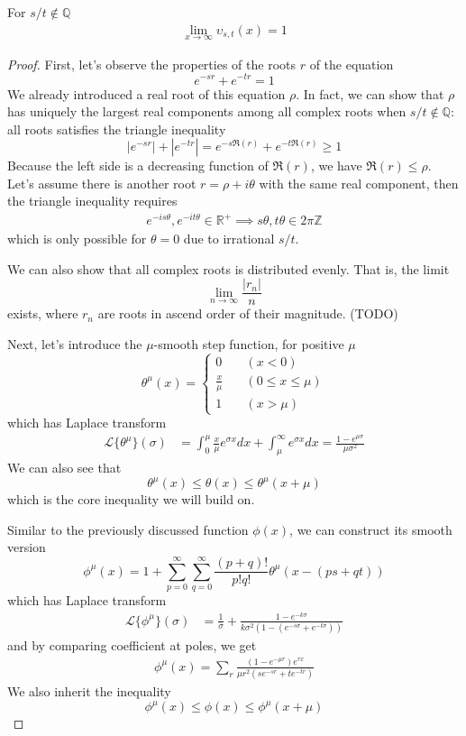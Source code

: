 \documentclass[]{article}
\begin{document}
\vspace{1cm}
\begin{lemma}
	For $s/t\notin\mathbb{Q}$
	\begin{align*}
	\lim_{x\to\infty} \upsilon_{s,t}(x) = 1 
	\end{align*}
\end{lemma}
\begin{proof}
First, let's observe the properties of the roots $r$ of the equation
\[
e^{-sr} + e^{-tr} = 1
\]
We already introduced a real root of this equation $\rho$. In fact, we can show that $\rho$ has uniquely the largest real components among all complex roots when $s/t\notin\mathbb{Q}$: all roots satisfies the triangle inequality
\[
|e^{-sr}| + |e^{-tr}| = e^{-s\Re(r)} + e^{-t\Re(r)} \ge 1
\]
Because the left side is a decreasing function of $\Re(r)$, we have $\Re(r) \le \rho$. Let's assume there is another root $r=\rho + i\theta$ with the same real component, then the triangle inequality requires
\begin{align*}
e^{-is\theta},e^{-it\theta}\in\mathbb{R^+}\implies  s\theta,t\theta\in2\pi\mathbb{Z}
\end{align*}
which is only possible for $\theta = 0$ due to irrational $s/t$.

We can also show that all complex roots is distributed evenly. That is, the limit
\[
\lim_{n\to\infty} \frac{|r_n|}{n}
\]
exists, where $r_n$ are roots in ascend order of their magnitude. (TODO)

Next, let's introduce the $\mu$-smooth step function, for positive $\mu$
\[
\theta^{\mu}(x) = \begin{cases}
0 \quad &(x < 0) \\
\frac{x}{\mu} \quad &(0\le x\le \mu)\\
1 \quad &(x>\mu)
\end{cases}
\]
which has Laplace transform
\begin{align*}
\mathcal{L}\{\theta^{\mu}\}(\sigma) &= \int_0^{\mu} \frac{x}{\mu} e^{\sigma x} dx + \int_{\mu}^\infty e^{\sigma x} dx = \frac{1 - e^{\mu\sigma}}{\mu\sigma^2}
\end{align*}
We can also see that
\[
	\theta^{\mu}(x)\le\theta(x)\le\theta^{\mu}(x+\mu)
\]
which is the core inequality we will build on.

Similar to the previously discussed function $\phi(x)$, we can construct its smooth version
\[
\phi^{\mu}(x) = 1 + \sum_{p=0}^{\infty}\sum_{q=0}^{\infty}\frac{(p+q)!}{p!q!}\theta^{\mu}(x-(ps+qt))
\]
which has Laplace transform
\begin{align*}
\mathcal{L}\{\phi^{\mu}\}(\sigma) &= \frac{1}{\sigma} + \frac{1-e^{-k\sigma}}{k\sigma^2(1-(e^{-s\sigma} + e^{-t\sigma}))}
\end{align*}
and by comparing coefficient at poles, we get
\begin{align*}
\phi^{\mu}(x) = \sum_{r} \frac{(1-e^{-\mu r})e^{rx}}{\mu r^2(se^{-sr}+te^{-tr})}
\end{align*}
We also inherit the inequality
\[
\phi^{\mu}(x)\le\phi(x)\le\phi^{\mu}(x+\mu)
\]


\end{proof}
\end{document}
